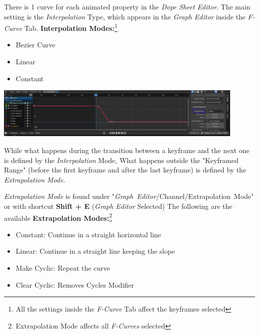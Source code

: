 \documentclass{article}
\begin{document}
There is 1 curve for each animated property in the \textit{Dope Sheet Editor}. The main setting is the \textit{Interpolation} Type, which appears in the \textit{Graph Editor} inside the
\textit{F-Curve} Tab. \textbf{Interpolation Modes:}\footnote{All the settings inside the \textit{F-Curve} Tab affect the keyframes selected}
\begin{itemize}[topsep=0pt, noitemsep]
    \item Bezier Curve
    \item Linear
    \item Constant
\end{itemize}
\begin{center}
    \includegraphics[width=0.9\textwidth]{blender_docs_images/my_graph_editor_interpolation_mode.png}
\end{center}
While what happens during the transition between a keyframe and the next one is defined by the \textit{Interpolation} Mode, What happens outside the "Keyframed Range"
(before the first keyframe and after the last keyframe) is defined by the \textit{Extrapolation Mode}.\par
\textit{Extrapolation Mode} is found under \mbox{"\textit{Graph Editor}/Channel/Extrapolation Mode"} or with shortcut \textbf{Shift + E} (\textit{Graph Editor} Selected)
The following are the available \textbf{Extrapolation Modes:}\footnote{Extrapolation Mode affects all \textit{F-Curves} selected}
\begin{itemize}[topsep=0pt, noitemsep]
    \item Constant: Continue in a straight horizontal line
    \item Linear: Continue in a straight line keeping the slope
    \item Make Cyclic: Repeat the curve
    \item Clear Cyclic: Removes Cycles Modifier
\end{itemize}
\end{document}
